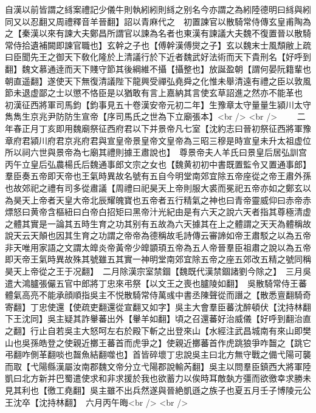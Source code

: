 自漢以前皆謂之絼案禮記少儀牛則執紖紖則絼之别名今亦謂之為紖陸德明曰絼與紖同又以忍翻又周禮釋音羊晉翻】詔以青麻代之　初置諫官以散騎常侍傳玄皇甫陶為之【秦漢以來有諫大夫鄭昌所謂官以諫為名者也東漢有諫議大夫魏不復置晉以散騎常侍拾遺補闕即諫官職也】玄幹之子也【傅幹漢傅爕之子】玄以魏末士風頹敝上疏曰臣聞先王之御天下敎化隆於上清議行於下近者魏武好法術而天下貴刑名【好呼到翻】魏文慕通逹而天下賤守節其後綱維不攝【攝整也】放誕盈朝【謂何晏阮籍輩也朝直遥翻】遂使天下無復清議陛下龍興受禪弘堯舜之化惟未舉清遠有禮之臣以敦風節未退虚鄙之士以懲不恪臣是以猶敢有言上嘉納其言使玄草詔進之然亦不能革也　初漢征西將軍司馬鈞【鈞事見五十卷漢安帝元初二年】生豫章太守量量生潁川太守雋雋生京兆尹防防生宣帝【序司馬氏之世為下立廟張本】<br />
<br />
　　二年春正月丁亥即用魏廟祭征西府君以下并景帝凡七室【沈約志曰晉初祭征西將軍豫章府君潁川府君京兆府君與宣皇帝景皇帝文皇帝為三昭三穆是時宣皇未升太祖虚位所以祠六世與景帝為七廟其禮則據王肅說也】　尊景帝夫人羊氏曰景皇后居弘訓宫　丙午立皇后弘農楊氏后魏通事郎文宗之女也【魏黄初初中書既置監令又置通事郎】　羣臣奏五帝即天帝也王氣時異故名號有五自今明堂南郊宜除五帝座從之帝王肅外孫也故郊祀之禮有司多從肅議【周禮曰祀昊天上帝則服大裘而冕祀五帝亦如之鄭玄以為昊天上帝者天皇大帝北辰耀魄寶也五帝者五行精氣之神也曰青帝靈威仰曰赤帝赤熛怒曰黄帝含樞紐曰白帝白招矩曰黑帝汁光紀由是有六天之說六天者指其尊極清虚之體其實是一論其五時生育之功其别有五故為六天據其在上之體謂之天天為體稱故說天云天顛也因其生育之功謂之帝帝為德稱故毛詩傳云審諦如帝王肅駁之以為五帝非天唯用家語之文謂太皥炎帝黃帝少皥顗頊五帝為五人帝晉羣臣祖肅之說以為五帝即天帝王氣時異故殊其號雖五其實一神明堂南郊宜除五帝之座五郊改五精之號同稱昊天上帝從之王于况翻】　二月除漢宗室禁錮【魏既代漢禁錮諸劉今除之】　三月吳遣大鴻臚張儼五官中郎將丁忠來弔祭【以文王之喪也臚陵如翻】　吳散騎常侍王蕃體氣高亮不能承顔順指吳主不悦散騎常侍萬彧中書丞陳聲從而譖之【散悉亶翻騎奇寄翻】丁忠使還【使疏吏翻還從宣翻又如字】吳主大會羣臣蕃沈醉頓伏【沈持林翻下王沈同】吳主疑其詐轝蕃出外【轝羊如翻】頃之召還蕃好治威儀【好呼到翻治直之翻】行止自若吳主大怒呵左右於殿下斬之出登來山【水經注武昌城南有來山即樊山也吳孫皓登之使親近擲王蕃首而虎爭之】使親近擲蕃首作虎跳狼爭咋齧之【跳它弔翻咋側革翻啖也齧魚結翻噬也】首皆碎壞丁忠說吳主曰北方無守戰之備弋陽可襲而取【弋陽縣漢屬汝南郡魏文帝分立弋陽郡說輸芮翻】吳主以問羣臣鎮西大將軍陸凱曰北方新并巴蜀遣使求和非求援於我也欲蓄力以俟時耳敵埶方彊而欲徼幸求勝未見其利也【徼工堯翻】吳主雖不出兵然遂與晉絶凱遜之族子也夏五月壬子博陵元公王沈卒【沈持林翻】　六月丙午晦<br />
<br />
